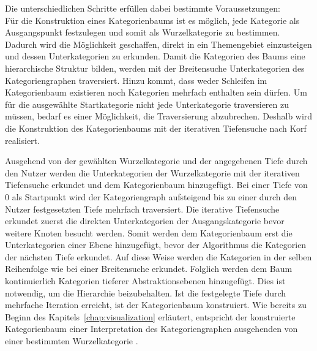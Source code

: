 Die unterschiedlichen Schritte erfüllen dabei bestimmte Voraussetzungen:\\
Für die Konstruktion eines Kategorienbaums ist es möglich, jede Kategorie als Ausgangspunkt festzulegen und somit als Wurzelkategorie zu bestimmen.
Dadurch wird die Möglichkeit geschaffen, direkt in ein Themengebiet einzusteigen und dessen Unterkategorien zu erkunden.
Damit die Kategorien des Baums eine hierarchische Struktur bilden, werden mit der Breitensuche Unterkategorien des Kategoriengraphen traversiert.
Hinzu kommt, dass weder Schleifen im Kategorienbaum existieren noch Kategorien mehrfach enthalten sein dürfen.
Um für die ausgewählte Startkategorie nicht jede Unterkategorie traversieren zu müssen, bedarf es einer Möglichkeit, die Traversierung abzubrechen.
Deshalb wird die Konstruktion des Kategorienbaums mit der iterativen Tiefensuche nach Korf~\cite{korf1985depth} realisiert.

Ausgehend von der gewählten Wurzelkategorie und der angegebenen Tiefe durch den Nutzer werden die Unterkategorien der Wurzelkategorie mit der iterativen Tiefensuche erkundet und dem Kategorienbaum hinzugefügt.
Bei einer Tiefe von 0 als Startpunkt wird der Kategoriengraph aufsteigend bis zu einer durch den Nutzer festgesetzten Tiefe mehrfach traversiert.
Die iterative Tiefensuche erkundet zuerst die direkten Unterkategorien der Ausgangskategorie bevor weitere Knoten besucht werden.
Somit werden dem Kategorienbaum erst die Unterkategorien einer Ebene hinzugefügt, bevor der Algorithmus die Kategorien der nächsten Tiefe erkundet.
Auf diese Weise werden die Kategorien in der selben Reihenfolge wie bei einer Breitensuche erkundet.
Folglich werden dem Baum kontinuierlich Kategorien tieferer Abstraktionsebenen hinzugefügt.
Dies ist notwendig, um die Hierarchie beizubehalten.
Ist die festgelegte Tiefe durch mehrfache Iteration erreicht, ist der Kategorienbaum konstruiert.
Wie bereits zu Beginn des Kapitels~\ref{chap:visualization} erläutert, entspricht der konstruierte Kategorienbaum einer Interpretation des Kategoriengraphen ausgehenden von einer bestimmten Wurzelkategorie .




